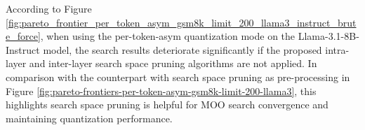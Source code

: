 According to Figure \ref{fig:pareto_frontier_per_token_asym_gsm8k_limit_200_llama3_instruct_brute_force}, when using the per-token-asym quantization mode on the Llama-3.1-8B-Instruct model, the search results deteriorate significantly if the proposed intra-layer and inter-layer search space pruning algorithms are not applied. In comparison with the counterpart with search space pruning as pre-processing in Figure \ref{fig:pareto-frontiers-per-token-asym-gsm8k-limit-200-llama3}, this highlights search space pruning is helpful for MOO search convergence and maintaining quantization performance.
